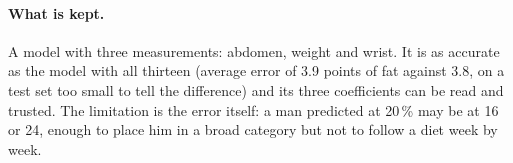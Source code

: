 \paragraph{What is kept.} A model with three measurements: abdomen,
weight and wrist. It is as accurate as the model with all thirteen
(average error of 3.9 points of fat against 3.8, on a test set too small to
tell the difference) and its three coefficients can be read and trusted.
The limitation is the error itself: a man predicted at 20\,\% may be at 16
or 24, enough to place him in a broad category but not to follow a diet
week by week.
